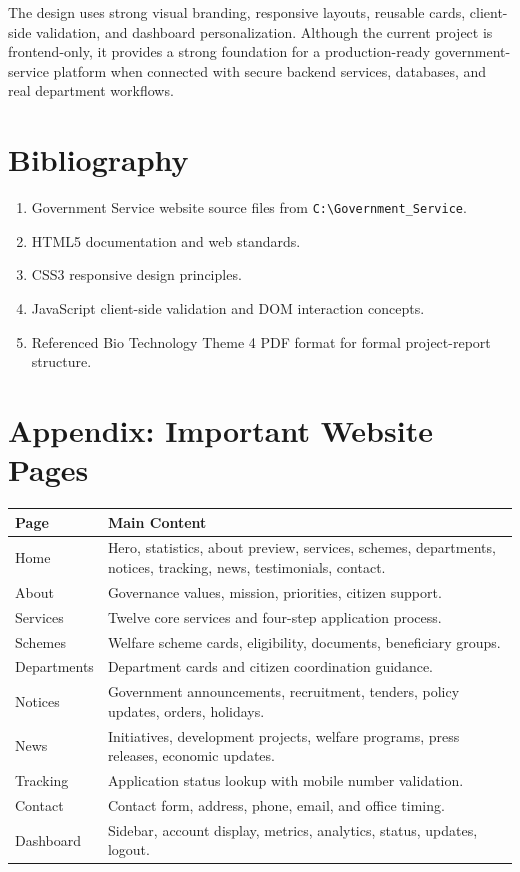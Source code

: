 \documentclass[12pt,a4paper]{report}
\begin{document}
The design uses strong visual branding, responsive layouts, reusable cards, client-side validation, and dashboard personalization. Although the current project is frontend-only, it provides a strong foundation for a production-ready government-service platform when connected with secure backend services, databases, and real department workflows.

\chapter*{Bibliography}
\begin{enumerate}[leftmargin=0.4in]
    \item Government Service website source files from \texttt{C:\textbackslash Government\_Service}.
    \item HTML5 documentation and web standards.
    \item CSS3 responsive design principles.
    \item JavaScript client-side validation and DOM interaction concepts.
    \item Referenced Bio Technology Theme 4 PDF format for formal project-report structure.
\end{enumerate}

\appendix
\chapter{Appendix: Important Website Pages}
\begin{longtable}{|p{2.0in}|p{3.6in}|}
\hline
\textbf{Page} & \textbf{Main Content} \\
\hline
Home & Hero, statistics, about preview, services, schemes, departments, notices, tracking, news, testimonials, contact. \\
\hline
About & Governance values, mission, priorities, citizen support. \\
\hline
Services & Twelve core services and four-step application process. \\
\hline
Schemes & Welfare scheme cards, eligibility, documents, beneficiary groups. \\
\hline
Departments & Department cards and citizen coordination guidance. \\
\hline
Notices & Government announcements, recruitment, tenders, policy updates, orders, holidays. \\
\hline
News & Initiatives, development projects, welfare programs, press releases, economic updates. \\
\hline
Tracking & Application status lookup with mobile number validation. \\
\hline
Contact & Contact form, address, phone, email, and office timing. \\
\hline
Dashboard & Sidebar, account display, metrics, analytics, status, updates, logout. \\
\hline
\end{longtable}
\end{document}
